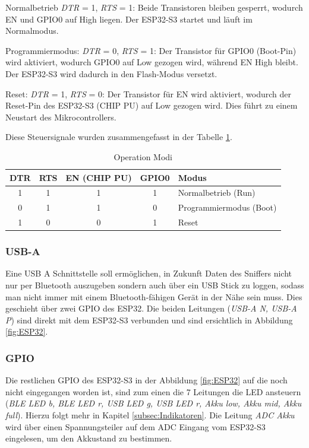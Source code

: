 Normalbetrieb
\textit{DTR} = 1, \textit{RTS} = 1: Beide Transistoren bleiben gesperrt, wodurch EN und GPIO0 auf High liegen. Der ESP32-S3 startet und läuft im Normalmodus.

Programmiermodus:
\textit{DTR} = 0, \textit{RTS} = 1: Der Transistor für GPIO0 (Boot-Pin) wird aktiviert, wodurch GPIO0 auf Low gezogen wird, während EN High bleibt. Der ESP32-S3 wird dadurch in den Flash-Modus versetzt.

Reset:
\textit{DTR} = 1, \textit{RTS} = 0: Der Transistor für EN wird aktiviert, wodurch der Reset-Pin des ESP32-S3 (CHIP PU) auf Low gezogen wird. Dies führt zu einem Neustart des Mikrocontrollers. 

Diese Steuersignale wurden  zusammengefasst in der Tabelle \ref{tab:operation_modes}.
\begin{table}[h]
  \centering
  \begin{tabular}{|c|c|c|c|l|}
    \hline
    DTR & RTS & EN (CHIP PU) & GPIO0 & Modus \\ \hline
    1   & 1   & 1            & 1     & Normalbetrieb (Run) \\ \hline
    0   & 1   & 1            & 0     & Programmiermodus (Boot) \\ \hline
    1   & 0   & 0            & 1     & Reset \\ \hline
  \end{tabular}
  \caption{Operation Modi}
  \label{tab:operation_modes}
\end{table}



\subsubsection{USB-A}
Eine USB A Schnittstelle soll ermöglichen, in Zukunft Daten des Sniffers nicht nur per Bluetooth auszugeben sondern auch über ein USB Stick zu loggen, sodass man nicht immer mit einem Bluetooth-fähigen Gerät in der Nähe sein muss. Dies geschieht über zwei GPIO des ESP32. Die beiden Leitungen (\textit{USB-A N, USB-A P}) sind direkt mit dem ESP32-S3 verbunden und sind ersichtlich in Abbildung \ref{fig:ESP32}.

\subsubsection{GPIO}
 Die restlichen GPIO des ESP32-S3 in der Abbildung \ref{fig:ESP32} auf die noch nicht eingegangen worden ist, sind zum einen die 7 Leitungen die LED ansteuern (\textit{BLE LED b, BLE LED r, USB LED g, USB LED r, Akku low, Akku mid, Akku full}). Hierzu folgt mehr in Kapitel \ref{subsec:Indikatoren}. Die Leitung \textit{ADC Akku} wird über einen Spannungsteiler auf dem ADC Eingang vom ESP32-S3 eingelesen, um den Akkustand zu bestimmen.
 
